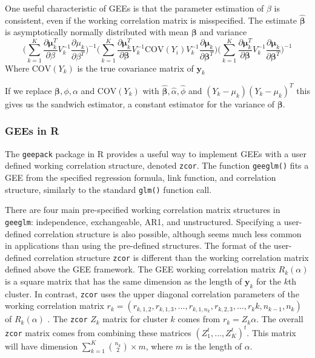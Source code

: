 \documentclass[12pt]{article}
\begin{document}
One useful characteristic of GEEs is that the parameter estimation of $\beta$ is consistent, even if the working correlation matrix is misspecified. The estimate $\hat{\boldsymbol\beta}$ is asymptotically normally distributed with mean $\boldsymbol\beta$ and variance
$$ \big(\sum_{k=1}^K  \frac{\partial  \boldsymbol{\mu}_k^T }{\partial \beta } V_k^{-1} \frac{\partial  \mu_k }{\partial \beta^T } \big)^{-1} \bigg(\sum_{k=1}^K  \frac{\partial  \boldsymbol\mu_k^T }{\partial \boldsymbol\beta } V_k^{-1}\text{COV}(Y_i)V_{k}^{-1}  \frac{\partial  \boldsymbol\mu_k }{\partial \boldsymbol\beta^T } \bigg)\big(\sum_{k=1}^K  \frac{\partial  \boldsymbol\mu_k^T }{\partial \boldsymbol\beta } V_k^{-1} \frac{\partial  \boldsymbol\mu_k }{\partial \boldsymbol\beta^T } \big)^{-1}$$
Where $\text{COV}(Y_k)$ is the true covariance matrix of $\mathbf{y}_k$

If we replace $ \boldsymbol\beta, \phi, \alpha$ and $\text{COV}(Y_k)$ with $\hat{\boldsymbol\beta}, \hat \alpha, \hat \phi$ and $(Y_k - \mu_k)(Y_k- \mu_k)^T$ this gives us the sandwich estimator, a constant estimator for the variance of $\boldsymbol\beta$.


\subsubsection{GEEs in R}

The \texttt{geepack} package \cite{geepack} in R \cite{R} provides a useful way to implement GEEs with a user defined working correlation structure, denoted \texttt{zcor}. The function \texttt{geeglm()} fits a GEE from the specified regression formula, link function, and correlation structure, similarly to the standard \texttt{glm()} function call.

There are four main pre-specified working correlation matrix structures in \texttt{geeglm}: independence, exchangeable, AR1, and unstructured. Specifying a user-defined correlation structure is also possible, although seems much less common in applications than using the pre-defined structures. The format of the user-defined correlation structure \texttt{zcor} is different than the working correlation matrix defined above the GEE framework. The GEE working correlation matrix $R_k(\alpha)$ is a square matrix that has the same dimension as the length of $\mathbf{y}_k$ for the $k$th cluster. In contrast, \texttt{zcor} uses the upper diagonal correlation parameters of the working correlation matrix $r_k = (r_{k, 1,2}, r_{k,1,3}, \ldots , r_{k,1,n_k}, r_{k,2,3}, \ldots , r_k{k,n_{k-1},n_k})$ of $R_{k}(\alpha)$ . The \texttt{zcor} $Z_k$ matrix for cluster $k$ comes from $r_k = Z_k \alpha$. The overall \texttt{zcor} matrix comes from combining these matrices $(Z_1^t, \ldots , Z_K^t)^t$. This matrix will have dimension $\sum_{k=1}^K \binom{n_k}{2} \times m$, where $m$ is the length of $\alpha$.
\end{document}

